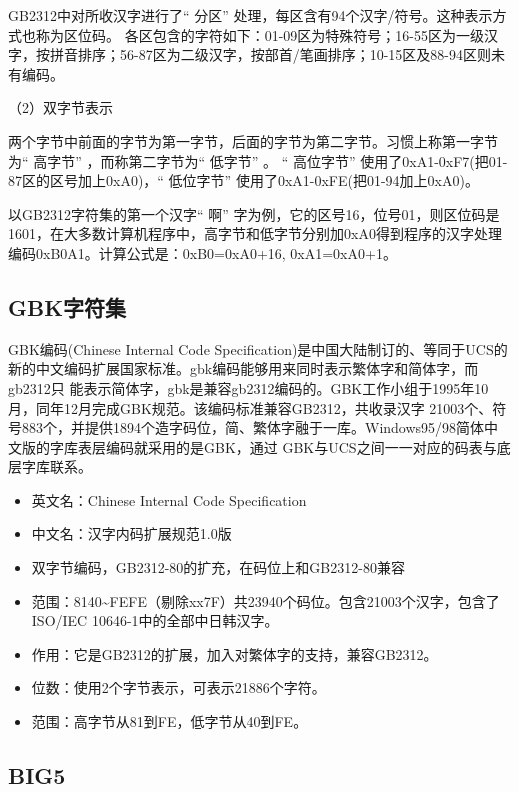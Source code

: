 \documentclass[doctor,openright,twoside]{sjtuthesis}
\providecommand{\tightlist}{%
    \setlength{\itemsep}{0pt}\setlength{\parskip}{0pt}}
\theoremstyle{plain}
\theoremstyle{definition}
\theoremstyle{remark}
\theoremstyle{ocrenumbox}
\theoremstyle{plain}
\begin{document}
GB2312中对所收汉字进行了`` 分区'' 处理，每区含有94个汉字/符号。这种表示方式也称为区位码。
各区包含的字符如下：01-09区为特殊符号；16-55区为一级汉字，按拼音排序；56-87区为二级汉字，按部首/笔画排序；10-15区及88-94区则未有编码。

（2）双字节表示

两个字节中前面的字节为第一字节，后面的字节为第二字节。习惯上称第一字节为`` 高字节'' ，而称第二字节为`` 低字节'' 。
`` 高位字节'' 使用了0xA1-0xF7(把01-87区的区号加上0xA0)，`` 低位字节'' 使用了0xA1-0xFE(把01-94加上0xA0)。

以GB2312字符集的第一个汉字`` 啊'' 字为例，它的区号16，位号01，则区位码是1601，在大多数计算机程序中，高字节和低字节分别加0xA0得到程序的汉字处理编码0xB0A1。计算公式是：0xB0=0xA0+16, 0xA1=0xA0+1。

\hypertarget{gbk}{%
\subsection{GBK字符集}\label{gbk}}

GBK编码(Chinese Internal Code Specification)是中国大陆制订的、等同于UCS的新的中文编码扩展国家标准。gbk编码能够用来同时表示繁体字和简体字，而gb2312只 能表示简体字，gbk是兼容gb2312编码的。GBK工作小组于1995年10月，同年12月完成GBK规范。该编码标准兼容GB2312，共收录汉字 21003个、符号883个，并提供1894个造字码位，简、繁体字融于一库。Windows95/98简体中文版的字库表层编码就采用的是GBK，通过 GBK与UCS之间一一对应的码表与底层字库联系。

\begin{itemize}
\tightlist
\item
  英文名：Chinese Internal Code Specification
\item
  中文名：汉字内码扩展规范1.0版
\item
  双字节编码，GB2312-80的扩充，在码位上和GB2312-80兼容
\item
  范围：8140\textasciitilde FEFE（剔除xx7F）共23940个码位。包含21003个汉字，包含了ISO/IEC 10646-1中的全部中日韩汉字。
\item
  作用：它是GB2312的扩展，加入对繁体字的支持，兼容GB2312。
\item
  位数：使用2个字节表示，可表示21886个字符。
\item
  范围：高字节从81到FE，低字节从40到FE。
\end{itemize}

\hypertarget{big5}{%
\subsection{BIG5}\label{big5}}
\end{document}
